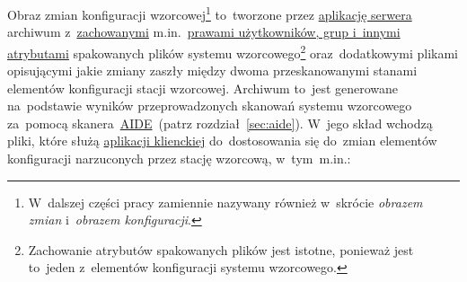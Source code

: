 \documentclass[thesis]{subfiles}
\begin{document}
Obraz zmian konfiguracji wzorcowej\footnote{W~dalszej części pracy zamiennie nazywany również w~skrócie \emph{obrazem zmian} i~\emph{obrazem konfiguracji}.} to~tworzone przez \hyperref[sec:srv-app]{aplikację serwera} archiwum  z~\href{https://unix.stackexchange.com/questions/43605/how-do-i-copy-a-folder-keeping-owners-and-permissions-intact}{zachowanymi} m.in.~\href{https://wiki.archlinux.org/index.php/File_permissions_and_attributes}{prawami użytkowników, grup i~innymi atrybutami} spakowanych plików systemu wzorcowego\footnote{Zachowanie atrybutów spakowanych plików jest istotne, ponieważ jest to~jeden z~elementów konfiguracji systemu wzorcowego.} oraz~dodatkowymi plikami opisującymi jakie zmiany zaszły między dwoma przeskanowanymi stanami elementów konfiguracji stacji wzorcowej. Archiwum to~jest generowane na~podstawie wyników przeprowadzonych skanowań systemu wzorcowego za~pomocą skanera~\hyperref[sec:aide]{AIDE}~(patrz rozdział~\ref{sec:aide}). W~jego skład wchodzą pliki, które służą \hyperref[sec:cli-app]{aplikacji klienckiej} do~dostosowania się do~zmian elementów konfiguracji narzuconych przez stację wzorcową, w~tym~m.in.:\mynobreakpar
\end{document}
